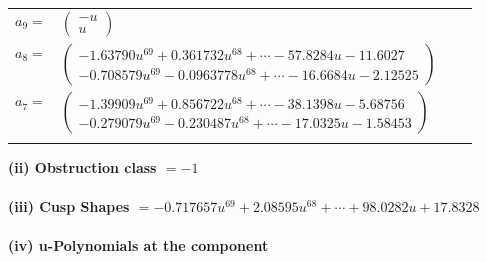 \documentclass[1p]{elsarticle_modified}
\theoremstyle{definition}
\begin{document}
\begin{tabular}{m{7pt} m{180pt} m{7pt} m{180pt} }
\flushright $a_{9}=$&$\begin{pmatrix}- u\\u\end{pmatrix}$ \\
\flushright $a_{8}=$&$\begin{pmatrix}-1.63790 u^{69}+0.361732 u^{68}+\cdots-57.8284 u-11.6027\\-0.708579 u^{69}-0.0963778 u^{68}+\cdots-16.6684 u-2.12525\end{pmatrix}$ \\
\flushright $a_{7}=$&$\begin{pmatrix}-1.39909 u^{69}+0.856722 u^{68}+\cdots-38.1398 u-5.68756\\-0.279079 u^{69}-0.230487 u^{68}+\cdots-17.0325 u-1.58453\end{pmatrix}$\\&\end{tabular}
\flushleft \textbf{(ii) Obstruction class $= -1$}\\~\\
\flushleft \textbf{(iii) Cusp Shapes $= -0.717657 u^{69}+2.08595 u^{68}+\cdots+98.0282 u+17.8328$}\\~\\
\newpage\renewcommand{\arraystretch}{1}
\flushleft \textbf{(iv) u-Polynomials at the component}\newline \\
\end{document}
